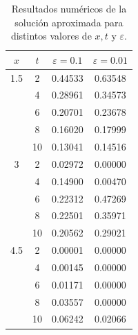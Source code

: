 \vspace{-12pt}
\begin{table}[h!]
	\small
	\centering
	\begin{tabular}{cccc}
		\toprule
		\boldmath $x$   &\boldmath $t$  &\boldmath $\varepsilon =0.1$ &\boldmath $\varepsilon =0.01$ \\
		\midrule
		1.5 & 2  &  0.44533     &  0.63548                          \\
		& 4  &  0.28961     &  0.34573                          \\
		& 6  &  0.20701     &  0.23678                          \\
		& 8  &  0.16020     &  0.17999                          \\
		& 10 &  0.13041     &  0.14516                          \\
		\hline
		3   & 2  &  0.02972     &  0.00000                          \\
		& 4  &  0.14900     &  0.00470                          \\
		& 6  &  0.22312     &  0.47269                          \\
		& 8  &  0.22501     &  0.35971                          \\
		& 10 &  0.20562     &  0.29021                          \\
		\hline
		4.5 & 2  &  0.00001     &  0.00000                          \\
		& 4  &  0.00145     &  0.00000                          \\
		& 6  &  0.01171     &  0.00000                          \\
		& 8  &  0.03557     &  0.00000                          \\
		& 10 &  0.06242     &  0.02066                          \\
		\bottomrule
	\end{tabular}
	\caption{Resultados numéricos de la solución aproximada para distintos valores de $x, t$ y $\varepsilon$.}\label{example2table}
\end{table}

